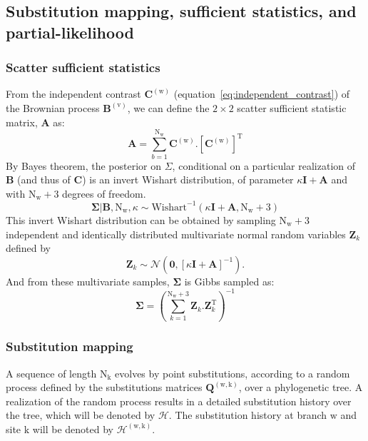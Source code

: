 \documentclass{article}
\newcommand{\site}{\text{k}}
\newcommand{\Nsite}{\text{N}_{\site}}
\newcommand{\branch}{\text{w}}
\newcommand{\Nbranch}{\text{N}_{\branch}}
\newcommand{\branchsite}{(\branch, \site)}
\newcommand{\node}{\text{v}}
\newcommand{\history}{\mathcal{H}}
\newcommand{\covariance}{\bm{\Sigma}}
\newcommand{\brownian}{\bm{B}}
\newcommand{\contrast}{\bm{C}}
\newcommand{\submatrix}{Q}
\newcommand{\Submatrix}{\bm{\submatrix}}
\begin{document}
\subsection{Substitution mapping, sufficient statistics, and partial-likelihood}

\subsubsection{Scatter sufficient statistics}

From the independent contrast $\contrast^{(\branch)}$ (equation~\ref{eq:independent_contrast}) of the Brownian process $\brownian^{(\node)}$, we can define the $2 \times 2$  scatter sufficient statistic matrix, $\bm{A}$ as:
\begin{equation}
\bm{A} = \sum_{b=1}^{\Nbranch} \contrast^{(\branch)}. \left[\contrast^{(\branch)}\right]^{\mathrm{T}}
\end{equation}
By Bayes theorem, the posterior on $\Sigma$, conditional on a particular realization of $\brownian$ (and thus of $\contrast$) is an invert Wishart distribution, of parameter $\kappa \bm{I} + \bm{A}$ and with $\Nbranch + 3$ degrees of freedom.
\begin{equation}
\covariance | \brownian, \Nbranch, \kappa  \sim \mathrm{Wishart}^{-1}\left( \kappa \bm{I} + \bm{A}, \Nbranch + 3\right)
\end{equation}
This invert Wishart distribution can be obtained by sampling $\Nbranch + 3$ independent and identically distributed multivariate normal random variables $\bm{Z}_{k}$ defined by
\begin{equation}
\bm{Z}_{k} \sim \mathcal{N} \left( \bm{0}, \left[\kappa \bm{I} + \bm{A}\right]^{-1} \right).
\end{equation}
And from these multivariate samples, $\covariance$ is Gibbs sampled as:
\begin{equation}
\covariance = \left( \sum_{k=1}^{\Nbranch + 3} \bm{Z}_{k}.\bm{Z}_{k}^{\mathrm{T}} \right)^{-1}
\end{equation}

\subsubsection{Substitution mapping}

A sequence of length $\Nsite$ evolves by point substitutions, according to a random process defined by the substitutions matrices $\Submatrix^{\branchsite}$, over a phylogenetic tree.
A realization of the random process results in a detailed substitution history over the tree, which will be denoted by $\history$.
The substitution history at branch $\branch$ and site $\site$ will be denoted by $\history^{\branchsite}$.
\end{document}
